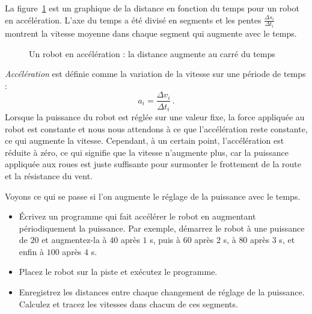 {La figure~\ref{fig.instant-v} est un graphique de la distance en fonction du temps pour un robot en accélération. L'axe du temps a été divisé en segments et les pentes $\displaystyle\frac{\Delta s_i}{\Delta t_i}$ montrent la vitesse moyenne dans chaque segment qui augmente avec le temps.

\begin{figure}
\begin{center}
\caption{Un robot en accélération : la distance augmente au carré du temps}\label{fig.instant-v}
\end{center}
\end{figure}

\emph{Accélération} est définie comme la variation de la vitesse sur une période de temps :
\[a_i = \frac{\Delta v_i}{\Delta t_i}\,.\]
Lorsque la puissance du robot est réglée sur une valeur fixe, la force appliquée au robot est constante et nous nous attendons à ce que l'accélération reste constante, ce qui augmente la vitesse. Cependant, à un certain point, l'accélération est réduite à zéro, ce qui signifie que la vitesse n'augmente plus, car la puissance appliquée aux roues est juste suffisante pour surmonter le frottement de la route et la résistance du vent.

Voyons ce qui se passe si l'on augmente le réglage de la puissance avec le temps.

\begin{framed}
\begin{itemize}
\item Écrivez un programme qui fait accélérer le robot en augmentant périodiquement la puissance. Par exemple, démarrez le robot à une puissance de $20$ et augmentez-la à $40$ après $1$ s, puis à $60$ après $2$ s, à $80$ après $3$ s, et enfin à $100$ après $4$ s.
\item Placez le robot sur la piste et exécutez le programme.
\item Enregistrez les distances entre chaque changement de réglage de la puissance. Calculez et tracez les vitesses dans chacun de ces segments.
\end{itemize}
\end{framed}


}
